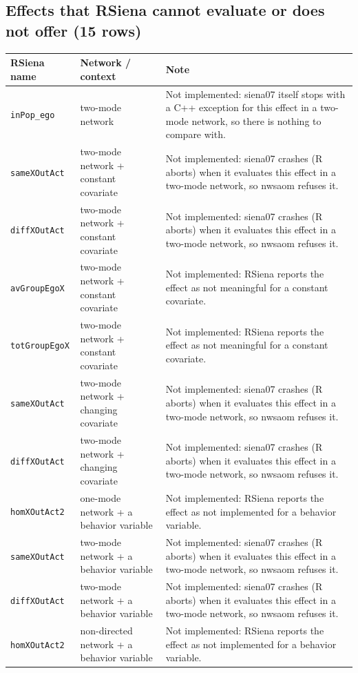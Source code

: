 \subsection*{Effects that RSiena cannot evaluate or does not offer (15 rows)}
\footnotesize
\begin{longtable}{@{}p{2.8cm}p{4.6cm}p{6.5cm}@{}}
\toprule
RSiena name & Network / context & Note\\
\midrule
\endhead
\texttt{inPop\_ego} & two-mode network & Not implemented: siena07 itself stops with a C++ exception for this effect in a two-mode network, so there is nothing to compare with.\\
\texttt{sameXOutAct} & two-mode network + constant covariate & Not implemented: siena07 crashes (R aborts) when it evaluates this effect in a two-mode network, so nwsaom refuses it.\\
\texttt{diffXOutAct} & two-mode network + constant covariate & Not implemented: siena07 crashes (R aborts) when it evaluates this effect in a two-mode network, so nwsaom refuses it.\\
\texttt{avGroupEgoX} & two-mode network + constant covariate & Not implemented: RSiena reports the effect as not meaningful for a constant covariate.\\
\texttt{totGroupEgoX} & two-mode network + constant covariate & Not implemented: RSiena reports the effect as not meaningful for a constant covariate.\\
\texttt{sameXOutAct} & two-mode network + changing covariate & Not implemented: siena07 crashes (R aborts) when it evaluates this effect in a two-mode network, so nwsaom refuses it.\\
\texttt{diffXOutAct} & two-mode network + changing covariate & Not implemented: siena07 crashes (R aborts) when it evaluates this effect in a two-mode network, so nwsaom refuses it.\\
\texttt{homXOutAct2} & one-mode network + a behavior variable & Not implemented: RSiena reports the effect as not implemented for a behavior variable.\\
\texttt{sameXOutAct} & two-mode network + a behavior variable & Not implemented: siena07 crashes (R aborts) when it evaluates this effect in a two-mode network, so nwsaom refuses it.\\
\texttt{diffXOutAct} & two-mode network + a behavior variable & Not implemented: siena07 crashes (R aborts) when it evaluates this effect in a two-mode network, so nwsaom refuses it.\\
\texttt{homXOutAct2} & non-directed network + a behavior variable & Not implemented: RSiena reports the effect as not implemented for a behavior variable.\\

\end{longtable}
